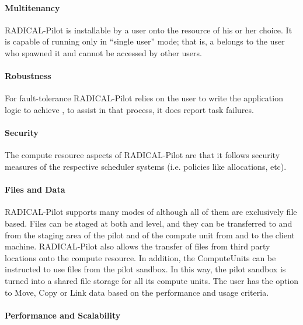 \documentclass{sig-alternate}
\begin{document}
\paragraph{Multitenancy}

RADICAL-Pilot is installable by a user onto the resource of his or her choice.
It is capable of running only in ``single user'' mode; that is, a \pilot
belongs to the user who spawned it and cannot be accessed by other users.

\paragraph{Robustness}

For fault-tolerance RADICAL-Pilot relies on the user to write the application
logic to achieve , to assist in that process, it does report
task failures.

\paragraph{Security}

The compute resource  aspects of RADICAL-Pilot are that it
follows security measures of the respective scheduler systems (i.e. policies
like allocations, etc).

\paragraph{Files and Data}

RADICAL-Pilot supports many modes of  although all of
them are exclusively file based. Files can be staged at both \pilot and
 level, and they can be transferred to and from the
staging area of the pilot and of the compute unit  from and to
the client machine. RADICAL-Pilot also allows the transfer of files from third
party locations onto the compute resource. In addition, the ComputeUnits can be
instructed to use files from the pilot sandbox. In this way, the pilot sandbox
is turned into a shared file storage for all its compute units. The user has
the option to Move, Copy or Link data based on the performance and usage
criteria.

\paragraph{Performance and Scalability}
\end{document}
